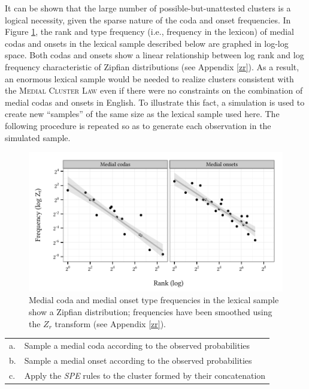 It can be shown that the large number of possible-but-unattested clusters is a logical necessity, given the sparse nature of the coda and onset frequencies. 
In Figure \ref{cao}, the rank and type frequency (i.e., frequency in the lexicon) of medial codas and onsets in the lexical sample described below are graphed in log-log space. 
Both codas and onsets show a linear relationship between log rank and log frequency characteristic of Zipfian distributions (see Appendix \ref{zr}). 
As a result, an enormous lexical sample would be needed to realize clusters consistent with the \textsc{Medial Cluster Law} even if there were no constraints on the combination of medial codas and onsets in English.
To illustrate this fact, a simulation is used to create new ``samples'' of the same size as the lexical sample used here. The following procedure is repeated so as to generate each observation in the simulated sample.

\begin{figure}[ht]
\centering
\includegraphics{co.pdf}
\caption{Medial coda and medial onset type frequencies in the lexical sample show a Zipfian distribution; frequencies have been smoothed using the $Z_r$ transform (see Appendix \ref{zr}).}
\label{cao}
\end{figure}

\begin{example}
\begin{tabular}{l l}
a. & Sample a medial coda according to the observed probabilities  \\
b. & Sample a medial onset according to the observed probabilities \\
c. & Apply the \emph{SPE} rules to the cluster formed by their concatenation \\
\end{tabular}
\end{example}

